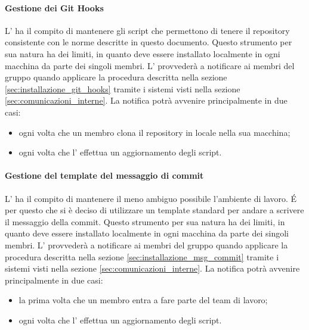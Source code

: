 			\paragraph{Gestione dei Git Hooks}
			L'\roleAdministrator{} ha il compito di mantenere gli script che permettono di tenere il repository consistente con le norme descritte in questo documento. \newline
			Questo strumento per sua natura ha dei limiti, in quanto deve essere installato localmente in ogni macchina da parte dei singoli membri. \newline
			L'\roleAdministrator{} provvederà a notificare ai membri del gruppo quando applicare la procedura descritta nella sezione \ref{sec:installazione_git_hooks} tramite i sistemi visti nella sezione \ref{sec:comunicazioni_interne}. \newline
			La notifica potrà avvenire principalmente in due casi:
				\begin{itemize}
					\item ogni volta che un membro clona il repository in locale nella sua macchina;
					\item ogni volta che l'\roleAdministrator{} effettua un aggiornamento degli script.
				\end{itemize}
				
			\paragraph{Gestione del template del messaggio di commit}
			L'\roleAdministrator{} ha il compito di mantenere il meno ambiguo possibile l'ambiente di lavoro. \'E per questo che si è deciso di utilizzare un template standard per andare a scrivere il messaggio della commit.
			Questo strumento per sua natura ha dei limiti, in quanto deve essere installato localmente in ogni macchina da parte dei singoli membri. \newline
			L'\roleAdministrator{} provvederà a notificare ai membri del gruppo quando applicare la procedura descritta nella sezione \ref{sec:installazione_msg_commit} tramite i sistemi visti nella sezione \ref{sec:comunicazioni_interne}. \newline
			La notifica potrà avvenire principalmente in due casi:
				\begin{itemize}
					\item la prima volta che un membro entra a fare parte del team di lavoro;
					\item ogni volta che l'\roleAdministrator{} effettua un aggiornamento degli script.
				\end{itemize}
				
